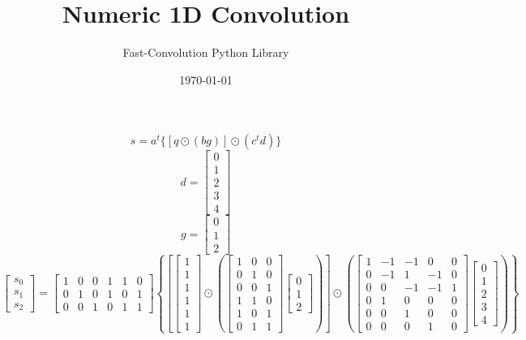 \documentclass{article}%
\title{Numeric 1D Convolution}%
\author{Fast{-}Convolution Python Library}%
\date{\today}%
\begin{document}
%
\normalsize%
\maketitle%
\[%
s = a^t \{[q \odot (bg)] \odot (c^t d)\}%
\]%
\[%
d = \left[\begin{matrix}0\\1\\2\\3\\4\end{matrix}\right]%
\]%
\[%
g = \left[\begin{matrix}0\\1\\2\end{matrix}\right]%
\]%
\[%
\left[\begin{matrix}s_{0}\\s_{1}\\s_{2}\end{matrix}\right] = \left[\begin{matrix}1 & 0 & 0 & 1 & 1 & 0\\0 & 1 & 0 & 1 & 0 & 1\\0 & 0 & 1 & 0 & 1 & 1\end{matrix}\right] \left\{ \left[ \left[\begin{matrix}1\\1\\1\\1\\1\\1\end{matrix}\right] \odot \left( \left[\begin{matrix}1 & 0 & 0\\0 & 1 & 0\\0 & 0 & 1\\1 & 1 & 0\\1 & 0 & 1\\0 & 1 & 1\end{matrix}\right] \left[\begin{matrix}0\\1\\2\end{matrix}\right] \right) \right] \odot \left( \left[\begin{matrix}1 & -1 & -1 & 0 & 0\\0 & -1 & 1 & -1 & 0\\0 & 0 & -1 & -1 & 1\\0 & 1 & 0 & 0 & 0\\0 & 0 & 1 & 0 & 0\\0 & 0 & 0 & 1 & 0\end{matrix}\right] \left[\begin{matrix}0\\1\\2\\3\\4\end{matrix}\right] \right) \right\}%
\]%
\end{document}
